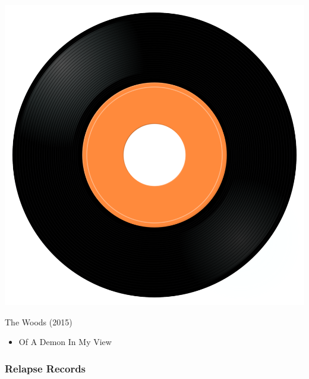 \begin{minipage}[t]{0.25\textwidth}\vspace{0pt}
\captionsetup{type=figure}
\includegraphics[width=\textwidth]{Images/cover.png}
\caption*{The Woods (2015)}
\end{minipage}
\begin{minipage}[t]{0.25\textwidth}\vspace{0pt}
\begin{itemize}[nosep,leftmargin=1em,labelwidth=*,align=left]
	\setlength{\itemsep}{0pt}
	\item Of A Demon In My View
\end{itemize}
\end{minipage}

\subsubsection{Relapse Records}

